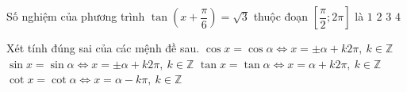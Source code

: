 \begin{ex}%
	Số nghiệm của phương trình $\tan\left(x+\dfrac{\pi}{6}\right)=\sqrt{3}$ thuộc đoạn $\left[\dfrac{\pi}{2};2\pi\right]$ là 
	 \choice
		 {\True $1$}
		 {$2$}
		{$3$} 
		{$4$} 
\end{ex}


\begin{ex}%
 Xét tính đúng sai của các  mệnh đề sau.
 \choiceTF 
  {$\cos x=\cos\alpha\Leftrightarrow x=\pm\alpha+k 2\pi,\ k\in\mathbb{Z}$} 
  {\True $\sin x=\sin\alpha\Leftrightarrow x=\pm\alpha+k 2\pi,\ k\in\mathbb{Z}$} 
  {\True $\tan x=\tan\alpha\Leftrightarrow x=\alpha+k2\pi,\ k\in\mathbb{Z}$} 
  {$\cot  x=\cot\alpha\Leftrightarrow x=\alpha-k\pi,\ k\in\mathbb{Z}$}
\end{ex}

